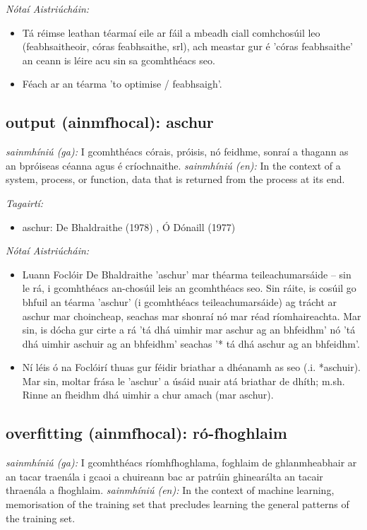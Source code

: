 \documentclass{article}
\begin{document}
 \noindent \textit{Nótaí Aistriúcháin:}
\begin{itemize}
	\item Tá réimse leathan téarmaí eile ar fáil a mbeadh ciall comhchosúil leo (feabhsaitheoir, córas feabhsaithe, srl), ach meastar gur é 'córas feabhsaithe' an ceann is léire acu sin sa gcomhthéacs seo.
	\item Féach ar an téarma 'to optimise / feabhsaigh'.
\end{itemize}


\subsection*{output (ainmfhocal): aschur} 
 \noindent \textit{sainmhíniú (ga):} I gcomhthéacs córais, próisis, nó feidhme, sonraí a thagann as an bpróiseas céanna agus é críochnaithe.
\newline\newline
 \noindent \textit{sainmhíniú (en):} In the context of a system, process, or function, data that is returned from the process at its end.
\newline

 \noindent \textit{Tagairtí:}
\begin{itemize}
	\item aschur: De Bhaldraithe (1978) \cite{de-bhaldraithe}, Ó Dónaill (1977) \cite{odonaill}
\end{itemize}

 \noindent \textit{Nótaí Aistriúcháin:}
\begin{itemize}
	\item Luann Foclóir De Bhaldraithe 'aschur' mar théarma teileachumarsáide -- sin le rá, i gcomhthéacs an-chosúil leis an gcomhthéacs seo. Sin ráite, is cosúil go bhfuil an téarma 'aschur' (i gcomhthéacs teileachumarsáide) ag trácht ar aschur mar choincheap, seachas mar shonraí nó mar réad ríomhaireachta. Mar sin, is dócha gur cirte a rá 'tá dhá uimhir mar aschur ag an bhfeidhm' nó 'tá dhá uimhir aschuir ag an bhfeidhm' seachas '* tá dhá aschur ag an bhfeidhm'.
	\item Ní léis ó na Foclóirí thuas gur féidir briathar a dhéanamh as seo (.i. *aschuir). Mar sin, moltar frása le 'aschur' a úsáid nuair atá briathar de dhíth; m.sh. Rinne an fheidhm dhá uimhir a chur amach (mar aschur).
\end{itemize}


\subsection*{overfitting (ainmfhocal): ró-fhoghlaim} 
 \noindent \textit{sainmhíniú (ga):} I gcomhthéacs ríomhfhoghlama, foghlaim de ghlanmheabhair ar an tacar traenála i gcaoi a chuireann bac ar patrúin ghinearálta an tacair thraenála a fhoghlaim.
\newline\newline
 \noindent \textit{sainmhíniú (en):} In the context of machine learning, memorisation of the training set that precludes learning the general patterns of the training set.
\newline
\end{document}
